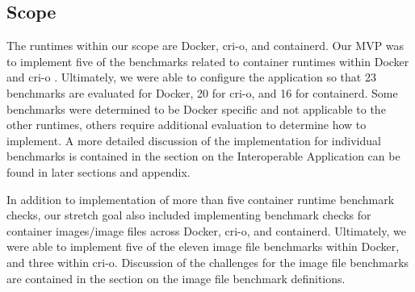\subsection*{Scope}


The runtimes within our scope are Docker, cri-o, and containerd. Our MVP was to implement five of the benchmarks related to container runtimes within Docker and cri-o \cite[Ch. 5]{center_for_internet_security}. Ultimately, we were able to configure the application so that 23 benchmarks are evaluated for Docker, 20 for cri-o, and 16 for containerd. Some benchmarks were determined to be Docker specific and not applicable to the other runtimes, others require additional evaluation to determine how to implement. A more detailed discussion of the implementation for individual benchmarks is contained in the section on the Interoperable Application can be found in later sections and appendix. 

In addition to implementation of more than five container runtime benchmark checks, our stretch goal also included implementing benchmark checks for container images/image files \cite[Ch. 4]{center_for_internet_security} across Docker, cri-o, and containerd. Ultimately, we were able to implement five of the eleven image file benchmarks within Docker, and three within cri-o. Discussion of the challenges for the image file benchmarks are contained in the section on the image file benchmark definitions.